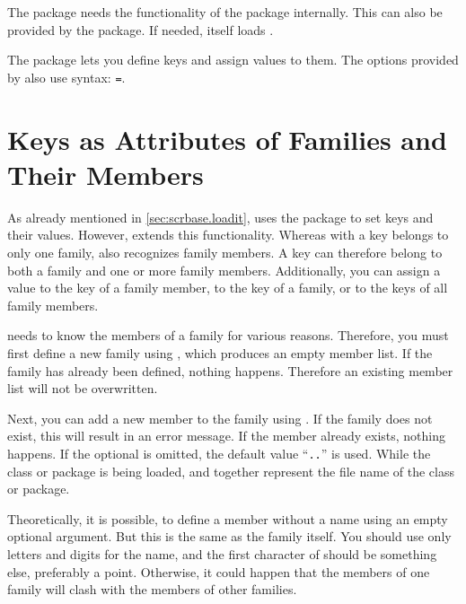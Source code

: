The  package needs the functionality of the
 package internally. This can also be
provided by the  package. If needed,  itself
loads .

The  package lets you define keys and assign values to them.
The options provided by  also use  syntax:
\texttt{=}.


\section{Keys as Attributes of Families and Their Members}

As already mentioned in \autoref{sec:scrbase.loadit},  uses
the  package to set keys and their values. However,
 extends this functionality. Whereas with  a
key belongs to only one family,  also recognizes family
members. A key can therefore belong to both a family and one or more family
members. Additionally, you can assign a value to the key of a family member,
to the key of a family, or to the keys of all family members.

\begin{Declaration}
\end{Declaration}
 needs to know the members of a family for various reasons.
Therefore, you must first define a new family using ,
which produces an empty member list. If the family has already been defined,
nothing happens. Therefore an existing member list will not be overwritten.

Next, you can add a new member to the family using .
If the family does not exist, this will result in an error message. If the
member already exists, nothing happens. If the optional  is
omitted, the default value
``\texttt{.}\texttt{.}'' is used. While
the class or package is being loaded,  and 
together represent the file name of the class or package.

Theoretically, it is possible, to define a member without a name using an
empty optional  argument. But this is the same as the family
itself. You should use only letters and digits for the  name,
and the first character of  should be something else, preferably
a point. Otherwise, it could happen that the members of one family will clash
with the members of other families.

